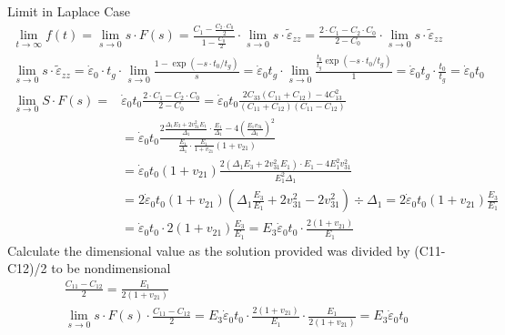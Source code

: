 \documentclass[10pt]{article}
\begin{document}
Limit in Laplace Case
$$
\begin{gathered}
\lim _{t \rightarrow \infty} f(t)=\lim _{s \rightarrow 0} s \cdot F(s)=\frac{C_{1}-\frac{C_{2} \cdot C_{0}}{2}}{1-\frac{C_{0}}{2}} \cdot \lim _{s \rightarrow 0} s \cdot \tilde{\varepsilon}_{z z}=\frac{2 \cdot C_{1}-C_{2} \cdot C_{0}}{2-C_{0}} \cdot \lim _{s \rightarrow 0} s \cdot \tilde{\varepsilon}_{z z} \\
\lim _{s \rightarrow 0} s \cdot \tilde{\varepsilon}_{z z}=\dot{\varepsilon}_{0} \cdot t_{g} \cdot \lim _{s \rightarrow 0} \frac{1-\exp \left(-s \cdot t_{0} / t_{g}\right)}{s}=\dot{\varepsilon}_{0} t_{g} \cdot \lim _{s \rightarrow 0} \frac{\frac{t_{0}}{t_{g}} \exp \left(-s \cdot t_{0} / t_{g}\right)}{1}=\dot{\varepsilon}_{0} t_{g} \cdot \frac{t_{0}}{t_{g}}=\dot{\varepsilon}_{0} t_{0}
\end{gathered}
$$
$$
\begin{aligned}
\lim _{s \rightarrow 0} S \cdot F(s)=& \dot{\varepsilon}_{0} t_{0} \frac{2 \cdot C_{1}-C_{2} \cdot C_{0}}{2-C_{0}}=\dot{\varepsilon}_{0} t_{0} \frac{2 C_{33}\left(C_{11}+C_{12}\right)-4 C_{13}^{2}}{\left(C_{11}+C_{12}\right)\left(C_{11}-C_{12}\right)} \\
&=\dot{\varepsilon}_{0} t_{0} \frac{2 \frac{\Delta_{1} E_{3}+2 v_{31}^{2} E_{1}}{\Delta_{1}} \cdot \frac{E_{1}}{\Delta_{1}}-4\left(\frac{E_{1} v_{31}}{\Delta_{1}}\right)^{2}}{\frac{E_{1}}{\Delta_{1}} \cdot \frac{E_{1}}{1+v_{21}}\left(1+v_{21}\right)} \\
&=\dot{\varepsilon}_{0} t_{0}\left(1+v_{21}\right) \frac{2\left(\Delta_{1} E_{3}+2 v_{31}^{2} E_{1}\right) \cdot E_{1}-4 E_{1}^{2} v_{31}^{2}}{E_{1}^{2} \Delta_{1}} \\
&=2 \dot{\varepsilon}_{0} t_{0}\left(1+v_{21}\right)\left(\Delta_{1} \frac{E_{3}}{E_{1}}+2 v_{31}^{2}-2 v_{31}^{2}\right) \div \Delta_{1}=2 \dot{\varepsilon}_{0} t_{0}\left(1+v_{21}\right) \frac{E_{3}}{E_{1}} \\
&=\dot{\varepsilon}_{0} t_{0} \cdot 2\left(1+v_{21}\right) \frac{E_{3}}{E_{1}}=E_{3} \dot{\varepsilon}_{0} t_{0} \cdot \frac{2\left(1+v_{21}\right)}{E_{1}}
\end{aligned}
$$
Calculate the dimensional value as the solution provided was divided by (C11-C12)/2 to be nondimensional
$$
\begin{gathered}
\frac{C_{11}-C_{12}}{2}=\frac{E_{1}}{2\left(1+v_{21}\right)} \\
\lim _{s \rightarrow 0} s \cdot F(s) \cdot \frac{C_{11}-C_{12}}{2}=E_{3} \dot{\varepsilon}_{0} t_{0} \cdot \frac{2\left(1+v_{21}\right)}{E_{1}} \cdot \frac{E_{1}}{2\left(1+v_{21}\right)}=E_{3} \dot{\varepsilon}_{0} t_{0}
\end{gathered}
$$
\end{document}
